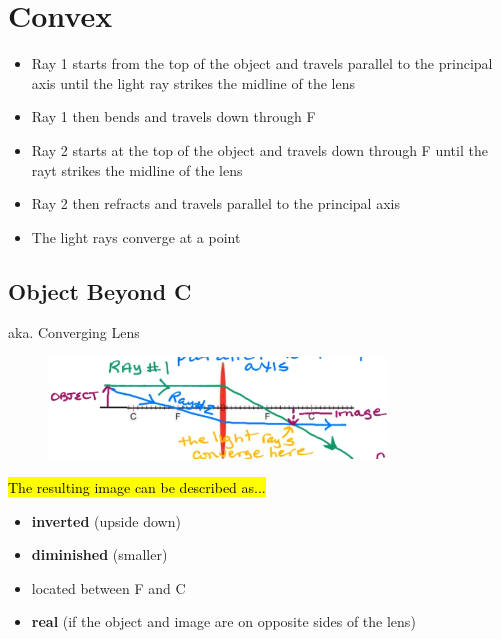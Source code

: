 \documentclass[a4paper,12pt]{article}
\begin{document}
\section{Convex}
\begin{itemize}
    \item{Ray 1 starts from the top of the object and travels parallel to the principal axis until the light ray strikes the midline of the lens}
    \item{Ray 1 then bends and travels down through F}
    \item{Ray 2 starts at the top of the object and travels down through F until the rayt strikes the midline of the lens}
    \item{Ray 2 then refracts and travels parallel to the principal axis}
    \item{The light rays converge at a point}
\end{itemize}

\subsection{Object Beyond C}
aka. Converging Lens

\begin{figure}[H]
    \centering
    \includegraphics[width=0.8\textwidth]{convex}
\end{figure}

\hl{The resulting image can be described as...}
\begin{itemize}
    \item{\textbf{inverted} (upside down)}
    \item{\textbf{diminished} (smaller)}
    \item{located between F and C}
    \item{\textbf{real} (if the object and image are on opposite sides of the lens)}
\end{itemize}


\pagebreak
\end{document}
